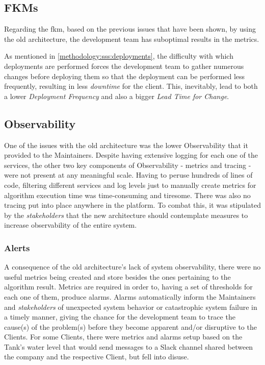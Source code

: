 \subsection{FKMs}\label{methodology:sss:fkms}

Regarding the \gls{fkm}, based on the previous issues that have been shown, by using the old architecture, the development team has suboptimal results in the metrics.

As mentioned in \cref{methodology:sss:deployments}, the difficulty with which deployments are performed forces the development team to gather numerous changes before deploying them so that the deployment can be performed less frequently, resulting in less \textit{downtime} for the client. This, inevitably, lead to both a lower \textit{Deployment Frequency} and also a bigger \textit{Lead Time for Change}.



\subsection{Observability}\label{methodology:ss:observability}

One of the issues with the old architecture was the lower Observability that it provided to the Maintainers. Despite having extensive logging for each one of the services, the other two key components of Observability - metrics and tracing - were not present at any meaningful scale. Having to peruse hundreds of lines of code, filtering different services and log levels just to manually create metrics for algorithm execution time was time-consuming and tiresome. There was also no tracing put into place anywhere in the platform. To combat this, it was stipulated by the \textit{stakeholders} that the new architecture should contemplate measures to increase observability of the entire system.

\subsubsection{Alerts}\label{methodology:sss:alerts}
A consequence of the old architecture's lack of system observability, there were no useful metrics being created and store besides the ones pertaining to the algorithm result. Metrics are required in order to, having a set of thresholds for each one of them, produce alarms. Alarms automatically inform the Maintainers and \textit{stakeholders} of unexpected system behavior or catastrophic system failure in a timely manner, giving the chance for the development team to trace the cause(s) of the problem(s) before they become apparent and/or disruptive to the Clients. For some Clients, there were metrics and alarms setup based on the Tank's water level that would send messages to a Slack channel shared between the company and the respective Client, but fell into disuse.



